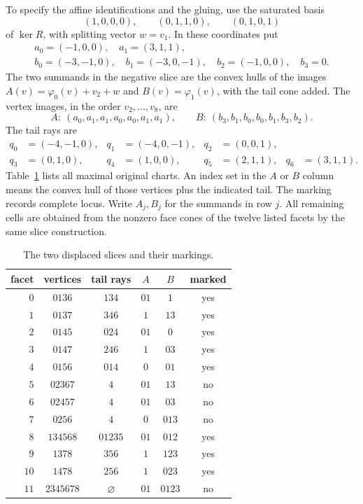 To specify the affine identifications and the gluing, use the
saturated basis
\[
(1,0,0,0),\qquad(0,1,1,0),\qquad(0,1,0,1)
\]
of $\ker R$, with splitting vector $w=v_1$.  In these coordinates put
\[
\begin{gathered}
a_0=(-1,0,0),\quad a_1=(3,1,1),\\
b_0=(-3,-1,0),\quad b_1=(-3,0,-1),\quad b_2=(-1,0,0),\quad b_3=0.
\end{gathered}
\]
The two summands in the negative slice are the convex hulls of
the images $A(v)=\varphi_0(v)+v_2+w$ and $B(v)=\varphi_1(v)$,
with the tail cone added.  The vertex images, in the order
$v_2,\ldots,v_8$, are
\[
A:\ (a_0,a_1,a_1,a_0,a_0,a_1,a_1),\qquad
B:\ (b_3,b_1,b_0,b_0,b_1,b_3,b_2).
\]
The tail rays are
\[
\begin{aligned}
q_0&=(-4,-1,0),&q_1&=(-4,0,-1),&q_2&=(0,0,1),\\
q_3&=(0,1,0),&q_4&=(1,0,0),&q_5&=(2,1,1),&q_6&=(3,1,1).
\end{aligned}
\]
Table~\ref{tab:x9slices} lists all maximal original charts.  An
index set in the $A$ or $B$ column means the convex hull of those
vertices plus the indicated tail.  The marking records complete
locus.  Write $A_j,B_j$ for the summands in row $j$.
All remaining cells are obtained from the nonzero face
cones of the twelve listed facets by the same slice construction.

\begin{table}[ht]
\centering
\caption{The two displaced slices and their markings.}
\label{tab:x9slices}
\begin{tabular}{rccccc}
\toprule
facet & vertices & tail rays & $A$ & $B$ & marked \\
\midrule
$0$ & $0136$ & $134$ & $01$ & $1$ & yes \\
$1$ & $0137$ & $346$ & $1$ & $13$ & yes \\
$2$ & $0145$ & $024$ & $01$ & $0$ & yes \\
$3$ & $0147$ & $246$ & $1$ & $03$ & yes \\
$4$ & $0156$ & $014$ & $0$ & $01$ & yes \\
$5$ & $02367$ & $4$ & $01$ & $13$ & no \\
$6$ & $02457$ & $4$ & $01$ & $03$ & no \\
$7$ & $0256$ & $4$ & $0$ & $013$ & no \\
$8$ & $134568$ & $01235$ & $01$ & $012$ & yes \\
$9$ & $1378$ & $356$ & $1$ & $123$ & yes \\
$10$ & $1478$ & $256$ & $1$ & $023$ & yes \\
$11$ & $2345678$ & $\varnothing$ & $01$ & $0123$ & no \\
\bottomrule
\end{tabular}
\end{table}
